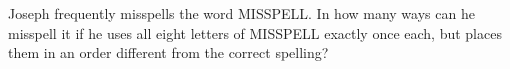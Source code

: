 Joseph frequently misspells the word MISSPELL. In how many ways can he misspell it if he uses all eight letters of MISSPELL exactly once each, but places them in an order different from the correct spelling?
